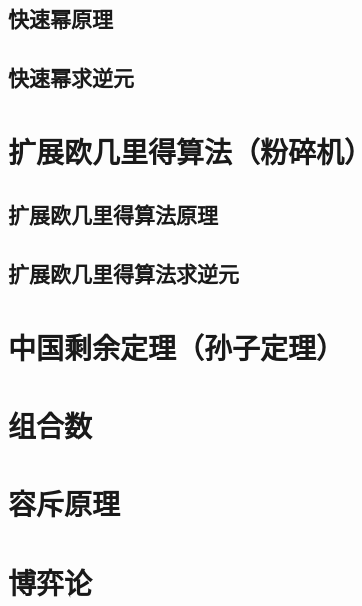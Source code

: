 \documentclass[]{book}
\begin{document}
\section{快速幂原理}
\section{快速幂求逆元}

\chapter{扩展欧几里得算法（粉碎机）}
\section{扩展欧几里得算法原理}
\section{扩展欧几里得算法求逆元}

\chapter{中国剩余定理（孙子定理）}

\chapter{组合数}

\chapter{容斥原理}

\chapter{博弈论}
\end{document}
